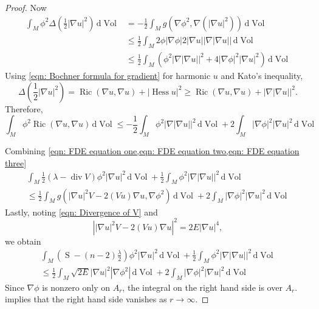 \documentclass{amsart}
\newcommand{\abs}[1]{\left| #1 \right|}
\newcommand{\derivative}{\mathrm{d}}
\newcommand{\brackets}[1]{\left( #1 \right)}
\DeclareMathOperator*{\ricci}{Ric}
\DeclareMathOperator*{\scalar}{S}
\DeclareMathOperator*{\divergence}{div}
\DeclareMathOperator*{\hessian}{Hess}
\DeclareMathOperator*{\Vol}{Vol}
\theoremstyle{plain}
\theoremstyle{plain}
\theoremstyle{plain}
\theoremstyle{plain}
\theoremstyle{remark}
\begin{document}
\begin{proof}
    Now 
    \begin{align*}
        \int_M \phi^2 \Delta \brackets{\frac{1}{2} \abs{\nabla u}^2}  \, \derivative{\Vol}
            &= - \frac{1}{2} \int_M g ( \nabla \phi^2 , \nabla (\abs{\nabla u}^2) ) \, \derivative{\Vol}  \\
            &\leq \frac{1}{2} \int_M 2\phi \abs{\nabla \phi}  2 \abs{\nabla u} \abs{\nabla \abs{\nabla u} }\, \derivative{\Vol} \\
            &\leq \frac{1}{2} \int_M \left( \phi^2 \abs{\nabla \abs{\nabla u} }^2 
                + 4 \abs{\nabla \phi}^2 \abs{\nabla u}^2 \right)  \, \derivative{\Vol}
    \end{align*}
    Using \cref{eqn: Bochner formula for gradient} for harmonic $u$ and Kato's inequality,
    \begin{equation*}
        \Delta \brackets{\frac{1}{2} \abs{\nabla u}^2} 
        = \ricci \brackets{\nabla u, \nabla u} 
         + \abs{ \hessian u}^2 \geq \ricci \brackets{\nabla u, \nabla u} + \abs{ \nabla \abs{\nabla u} }^2. 
    \end{equation*}
    Therefore,
    \begin{equation}\label{eqn: FDE equation three}
        \int_M \phi^2 \ricci (\nabla u, \nabla u) \, \derivative{\Vol} 
            \leq -\frac{1}{2} \int_M  \phi^2 \abs{\nabla \abs{\nabla u} }^2 \, \derivative{\Vol}
                + 2 \int_M \abs{\nabla \phi}^2 \abs{\nabla u}^2  \, \derivative{\Vol}
    \end{equation}

    Combining \cref{eqn: FDE equation one,eqn: FDE equation two,eqn: FDE equation three}
    \begin{multline}
        \int_M \frac{1}{2}  (\lambda - \divergence V) \phi^2 \abs{\nabla u}^2  \, \derivative{\Vol}
        + \frac{1}{2} \int_M  \phi^2 \abs{\nabla \abs{\nabla u} }^2 \, \derivative{\Vol}\\
            \leq 
                 \frac{1}{2} \int_M g( \abs{\nabla u}^2 V-2(Vu) \nabla u , \nabla \phi^2 ) \,\derivative{\Vol}
                + 2 \int_M \abs{\nabla \phi}^2 \abs{\nabla u}^2  \, \derivative{\Vol}
    \end{multline}
    Lastly, noting \cref{eqn: Divergence of V} and  
    $$ \abs{\abs{\nabla u}^2V -2(Vu)  \nabla u }^2 = 2E \abs{\nabla u}^4 ,$$
    we obtain
    \begin{multline}
        \int_M \left( \scalar - (n-2)\frac{\lambda}{2} \right) \phi^2 \abs{\nabla u}^2  \, \derivative{\Vol}
        + \frac{1}{2} \int_M  \phi^2 \abs{\nabla \abs{\nabla u} }^2 \, \derivative{\Vol}\\
            \leq \frac{1}{2} \int_M \sqrt{2E} \abs{\nabla u}^2   \abs{ \nabla \phi^2 } \,\derivative{\Vol}
                + 2 \int_M \abs{\nabla \phi}^2 \abs{\nabla u}^2  \, \derivative{\Vol}
    \end{multline}
    Since $\nabla \phi$ is nonzero only on $A_r$, the integral on the right hand side is over $A_r$.  implies that the right hand side vanishes as $r\to \infty$.


\end{proof}
\end{document}
